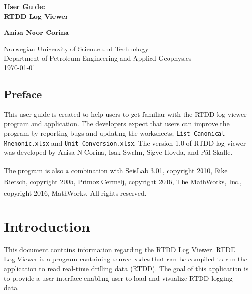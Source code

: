 \documentclass[12pt,a4paper,oneside]{report}
\begin{document}
\begin{titlepage}
    \begin{center}
        \vspace*{3cm}  
        {\LARGE
        \textbf{User Guide:\\ \vspace{5mm} RTDD Log Viewer}} 
        \vspace{1.5cm}
        
        \textbf{Anisa Noor Corina}
        
        \vfill
        
        Norwegian University of Science and Technology\\
        Department of Petroleum Engineering and Applied Geophysics\\
        \today
       
    \end{center}
\end{titlepage}

\section*{Preface}
This user guide is created to help users to get familiar with the RTDD log viewer program and application. The developers  expect that users can improve the program by reporting bugs and updating the worksheets; \texttt{List Canonical Mnemonic.xlsx} and \texttt{Unit Conversion.xlsx}.
The version 1.0 of RTDD log viewer was developed by Anisa N Corina, Isak Swahn, Sigve Hovda, and Pål Skalle.

The program is also a combination with SeisLab 3.01, copyright{\textsuperscript\textcopyright} 2010, Eike Rietsch, 
copyright {\textsuperscript\textcopyright} 2005, Primoz Cermelj, copyright {\textsuperscript\textcopyright} 2016, The MathWorks, Inc., copyright {\textsuperscript\textcopyright} 2016, MathWorks. All rights reserved.


\chapter{Introduction}
This document contains information regarding the RTDD Log Viewer. RTDD Log Viewer is a program containing source codes that can be compiled to run the application to read real-time drilling data (RTDD). The goal of this application is to provide a user interface enabling user to load and visualize RTDD logging data.
\end{document}
